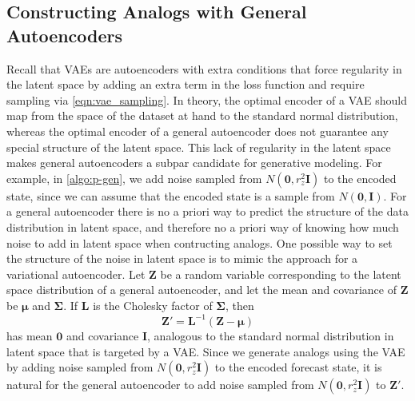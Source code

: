 \documentclass[final,3p]{elsarticle}
\theoremstyle{break}
\newcommand{\bb}[1]{\mathbf{#1}}
\begin{document}
\subsection{Constructing Analogs with General Autoencoders}\label{methods:patching_ae}
Recall that VAEs are autoencoders with extra conditions that force regularity in the latent space by adding an extra term in the loss function and require sampling via \cref{eqn:vae_sampling}.
In theory, the optimal encoder of a VAE should map from the space of the dataset at hand to the standard normal distribution, whereas the optimal encoder of a general autoencoder does not guarantee any special structure of the latent space.
This lack of regularity in the latent space makes general autoencoders a subpar candidate for generative modeling. 
For example, in \cref{algo:p-gen}, we add noise sampled from $N(\bb{0},r_z^2\bb{I})$ to the encoded state, since we can assume that the encoded state is a sample from $N(\bb{0},\bb{I})$.
For a general autoencoder there is no a priori way to predict the structure of the data distribution in latent space, and therefore no a priori way of knowing how much noise to add in latent space when contructing analogs.
One possible way to set the structure of the noise in latent space is to mimic the approach for a variational autoencoder.
Let $\bb{Z}$ be a random variable corresponding to the latent space distribution of a general autoencoder, and let the mean and covariance of $\bb{Z}$ be $\bb{\mu}$ and $\bb{\Sigma}$.
If $\bb{L}$ is the Cholesky factor of $\bb{\Sigma}$, then 
\begin{equation}
    \bb{Z}' = \bb{L}^{-1}(\bb{Z}-\bb{\mu})
\end{equation}
has mean $\bb{0}$ and covariance $\bb{I}$, analogous to the standard normal distribution in latent space that is targeted by a VAE.
Since we generate analogs using the VAE by adding noise sampled from $N(\bb{0},r_z^2\bb{I})$ to the encoded forecast state, it is natural for the general autoencoder to add noise sampled from $N(\bb{0},r_z^2\bb{I})$ to $\bb{Z}'$.
\end{document}
